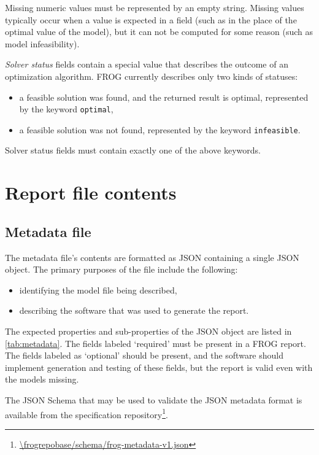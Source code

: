 Missing numeric values must be represented by an empty string. Missing values typically occur when a value is expected in a field (such as in the place of the optimal value of the model), but it can not be computed for some reason (such as model infeasibility).

\emph{Solver status} fields contain a special value that describes the outcome of an optimization algorithm. FROG currently describes only two kinds of statuses:
\begin{itemize}
\item a feasible solution was found, and the returned result is optimal, represented by the keyword \verb|optimal|,
\item a feasible solution was not found, represented by the keyword \verb|infeasible|.
\end{itemize}
Solver status fields must contain exactly one of the above keywords.

\section{Report file contents}

\subsection{Metadata file}
\label{sec:meta}

The metadata file's contents are formatted as JSON containing a single JSON object.
The primary purposes of the file include the following:
\begin{itemize}
\item identifying the model file being described,
\item describing the software that was used to generate the report.
\end{itemize}

The expected properties and sub-properties of the JSON object are listed in \cref{tab:metadata}. The fields labeled `required' must be present in a FROG report. The fields labeled as `optional' should be present, and the software should implement generation and testing of these fields, but the report is valid even with the models missing.

The JSON Schema that may be used to validate the JSON metadata format is available from the specification repository\footnote{\url{\frogrepobase/schema/frog-metadata-v1.json}}.

